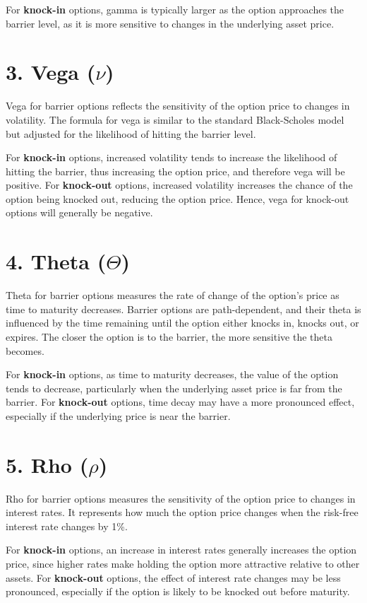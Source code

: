 For \textbf{knock-in} options, gamma is typically larger as the option approaches the barrier level, as it is more sensitive to changes in the underlying asset price.

\section*{3. Vega (\(\nu\))}

Vega for barrier options reflects the sensitivity of the option price to changes in volatility. The formula for vega is similar to the standard Black-Scholes model but adjusted for the likelihood of hitting the barrier level. 

For \textbf{knock-in} options, increased volatility tends to increase the likelihood of hitting the barrier, thus increasing the option price, and therefore vega will be positive. For \textbf{knock-out} options, increased volatility increases the chance of the option being knocked out, reducing the option price. Hence, vega for knock-out options will generally be negative.

\section*{4. Theta (\(\Theta\))}

Theta for barrier options measures the rate of change of the option's price as time to maturity decreases. Barrier options are path-dependent, and their theta is influenced by the time remaining until the option either knocks in, knocks out, or expires. The closer the option is to the barrier, the more sensitive the theta becomes.

For \textbf{knock-in} options, as time to maturity decreases, the value of the option tends to decrease, particularly when the underlying asset price is far from the barrier. For \textbf{knock-out} options, time decay may have a more pronounced effect, especially if the underlying price is near the barrier.

\section*{5. Rho (\(\rho\))}

Rho for barrier options measures the sensitivity of the option price to changes in interest rates. It represents how much the option price changes when the risk-free interest rate changes by 1\%.

For \textbf{knock-in} options, an increase in interest rates generally increases the option price, since higher rates make holding the option more attractive relative to other assets. For \textbf{knock-out} options, the effect of interest rate changes may be less pronounced, especially if the option is likely to be knocked out before maturity.

